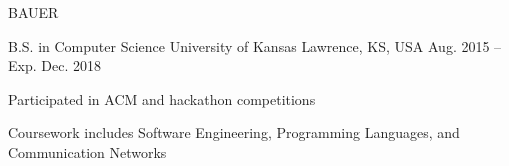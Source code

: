 \documentclass[11pt]{resume}
\begin{document}
\makecvheader[C]

\makecvfooter
  {BAUER}
  {\thepage}
  {\pageref{LastPage}}




\begin{cventries}
  \cventry
    {B.S. in Computer Science}
    {University of Kansas}
    {Lawrence, KS, USA}
    {Aug. 2015 – Exp. Dec. 2018}
    {
      \begin{cvitems}
      \item { Participated in ACM and hackathon competitions }
      \item { Coursework includes Software Engineering, Programming Languages,
          and Communication Networks }
      \end{cvitems}
    }

\end{cventries}

\end{document}
